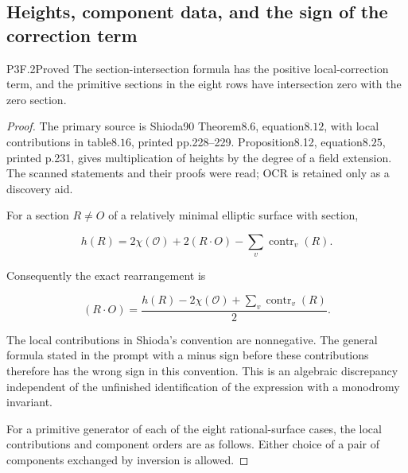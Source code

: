 \subsection{Heights, component data, and the sign of the correction term}
\begin{statement}{P3F.2}{Proved}
The section-intersection formula has the positive local-correction term, and the primitive sections in the eight rows have intersection zero with the zero section.
\end{statement}
\begin{proof}
The primary source is Shioda90 Theorem8.6, equation\(8.12\), with local contributions in table\(8.16\), printed pp.228--229. Proposition8.12, equation\(8.25\), printed p.231, gives multiplication of heights by the degree of a field extension. The scanned statements and their proofs were read; OCR is retained only as a discovery aid.

For a section \(R\ne O\) of a relatively minimal elliptic surface with section,

\[
 h(R)=2\chi(\mathcal O)+2(R\cdot O)
       -\sum_v\operatorname{contr}_v(R).
\]

Consequently the exact rearrangement is

\[
 (R\cdot O)=\frac{h(R)-2\chi(\mathcal O)
                    +\sum_v\operatorname{contr}_v(R)}2. \tag{P3F.2.1}
\]

The local contributions in Shioda's convention are nonnegative. The general formula stated in the prompt with a minus sign before these contributions therefore has the wrong sign in this convention. This is an algebraic discrepancy independent of the unfinished identification of the expression with a monodromy invariant.

For a primitive generator of each of the eight rational-surface cases, the local contributions and component orders are as follows. Either choice of a pair of components exchanged by inversion is allowed.


\end{proof}
